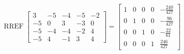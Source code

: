 \begin{exerciseAnswer} 


\[\operatorname{RREF} \left[\begin{array}{ccccc}
3 & -5 & -4 & -5 & -2 \\
-5 & 0 & 3 & -3 & 0 \\
-5 & -4 & -4 & -2 & 4 \\
-5 & 4 & -1 & 3 & 4
\end{array}\right] = \left[\begin{array}{ccccc}
1 & 0 & 0 & 0 & -\frac{240}{427} \\
0 & 1 & 0 & 0 & -\frac{96}{427} \\
0 & 0 & 1 & 0 & -\frac{22}{61} \\
0 & 0 & 0 & 1 & \frac{246}{427}
\end{array}\right] \]



\end{exerciseAnswer}
